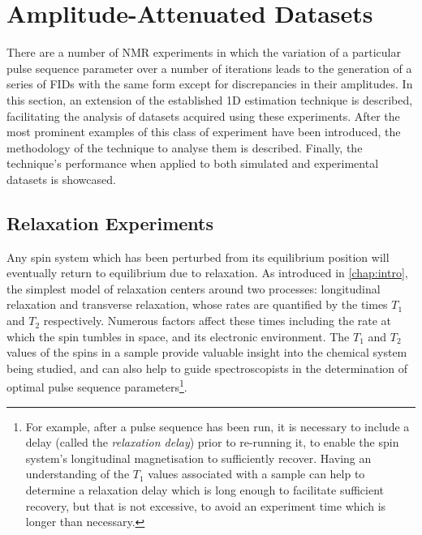 \section{Amplitude-Attenuated Datasets}
\label{sec:seq}
There are a number of \ac{NMR} experiments in which the
variation of a particular pulse sequence parameter over a number of iterations
leads to the generation of a series of
\acp{FID} with the same form except for discrepancies in their amplitudes.
In this section, an extension of the established \ac{1D} estimation
technique is described, facilitating the analysis of datasets acquired using
these experiments.
After the most prominent examples of this class of experiment have been
introduced, the methodology of the technique to analyse them is described.
Finally, the technique's performance when applied to both simulated and
experimental datasets is showcased.

\subsection{Relaxation Experiments}
\label{subsec:relaxation_experiments}
Any spin system which has been perturbed from its equilibrium position will
eventually return to equilibrium due to relaxation. As introduced in
\cref{chap:intro}, the simplest model of relaxation centers around two
processes: longitudinal relaxation and transverse relaxation, whose rates are
quantified by the times $T_1$ and  $T_2$ respectively.
Numerous factors affect these times  including the rate at which the spin
tumbles in space, and its electronic environment.
The $T_1$ and $T_2$ values of the spins in a sample provide valuable insight
into the chemical system being studied, and can also help to guide
spectroscopists in the determination of optimal pulse sequence
parameters\footnote{
    For example, after a pulse sequence has been run, it is necessary to include a
    delay (called the \emph{relaxation delay}) prior to
    re-running it, to enable the spin system's longitudinal magnetisation to
    sufficiently recover. Having an understanding of the $T_1$ values
    associated with a sample can help to determine a relaxation delay which is
    long enough to facilitate sufficient recovery, but that is not excessive, to
    avoid an experiment time which is longer than necessary.
}.

